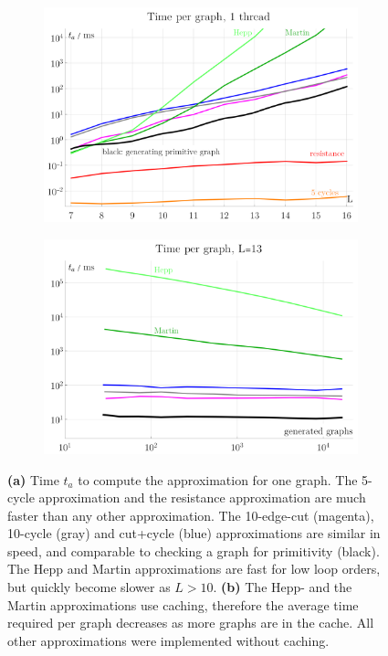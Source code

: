 \documentclass[12pt]{article}
\numberwithin{equation}{section}
\begin{document}
\begin{figure}[htb]
	
	\begin{subfigure}{ .49 \linewidth}
		\centering
		\includegraphics[width=\linewidth]{figures/ta}
		\subcaption{}
		\label{fig:ta}
	\end{subfigure}
	\begin{subfigure}{ .49 \linewidth}
		\centering
		\includegraphics[width=\linewidth]{figures/ta_generated}
		\subcaption{}
		\label{fig:ta_generated}
	\end{subfigure}
	\caption{ 
		\textbf{(a)} Time $t_a$ to compute the approximation for one graph. The 5-cycle approximation and the resistance approximation are much faster than any other approximation. The 10-edge-cut (magenta), 10-cycle (gray) and cut+cycle (blue) approximations are similar in speed, and comparable to checking a graph for primitivity (black). The Hepp and Martin approximations are fast for low loop orders, but quickly become slower as $L>10$.   
		\textbf{(b)} The Hepp- and the Martin approximations use caching, therefore the average time required per graph decreases as more graphs are in the cache. All other approximations were implemented without caching.}
	
\end{figure}
\end{document}
